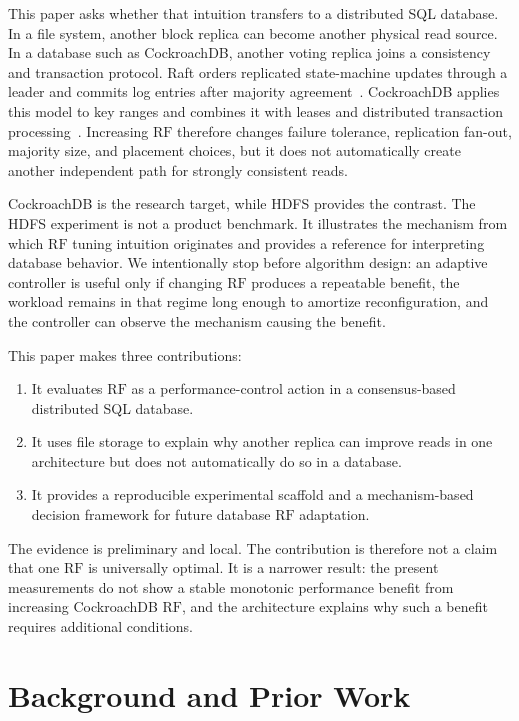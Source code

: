 \documentclass[a4paper,10pt,twocolumn]{article}
\newcommand{\rf}{\ensuremath{\mathrm{RF}}}
\newcommand{\cockroach}{CockroachDB}
\newcommand{\hdfs}{HDFS}
\begin{document}
This paper asks whether that intuition transfers to a distributed SQL
database. In a file system, another block replica can become another physical
read source. In a database such as \cockroach{}, another voting replica joins
a consistency and transaction protocol. Raft orders replicated state-machine
updates through a leader and commits log entries after majority
agreement~\citep{ongaro2014raft}. \cockroach{} applies this model to key ranges
and combines it with leases and distributed transaction
processing~\citep{taft2020cockroach}. Increasing \rf{} therefore changes
failure tolerance, replication fan-out, majority size, and placement choices,
but it does not automatically create another independent path for strongly
consistent reads.

\cockroach{} is the research target, while \hdfs{} provides the contrast. The
\hdfs{} experiment is not a product benchmark. It illustrates the mechanism
from which \rf{} tuning intuition originates and provides a reference for
interpreting database behavior. We intentionally stop before algorithm design:
an adaptive controller is useful only if changing \rf{} produces a repeatable
benefit, the workload remains in that regime long enough to amortize
reconfiguration, and the controller can observe the mechanism causing the
benefit.

This paper makes three contributions:

\begin{enumerate}
  \item It evaluates \rf{} as a performance-control action in a
  consensus-based distributed SQL database.
  \item It uses file storage to explain why another replica can improve reads
  in one architecture but does not automatically do so in a database.
  \item It provides a reproducible experimental scaffold and a
  mechanism-based decision framework for future database \rf{} adaptation.
\end{enumerate}

The evidence is preliminary and local. The contribution is therefore not a
claim that one \rf{} is universally optimal. It is a narrower result: the
present measurements do not show a stable monotonic performance benefit from
increasing \cockroach{} \rf{}, and the architecture explains why such a
benefit requires additional conditions.

\section{Background and Prior Work}
\label{sec:background}
\end{document}

